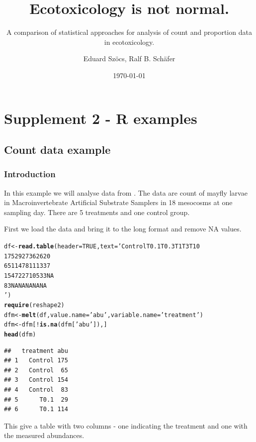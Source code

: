\documentclass{scrartcl}\usepackage[]{graphicx}\usepackage[]{color}
\title{Ecotoxicology is not normal.}
\subtitle{A comparison of statistical approaches for analysis of count and proportion data in ecotoxicology.}
\author{Eduard Szöcs, Ralf B. Schäfer}
\date{\today}
\makeatletter
\newcommand{\hlnum}[1]{\textcolor[rgb]{0.686,0.059,0.569}{#1}}%
\newcommand{\hlstr}[1]{\textcolor[rgb]{0.192,0.494,0.8}{#1}}%
\newcommand{\hlopt}[1]{\textcolor[rgb]{0,0,0}{#1}}%
\newcommand{\hlstd}[1]{\textcolor[rgb]{0.345,0.345,0.345}{#1}}%
\newcommand{\hlkwb}[1]{\textcolor[rgb]{0.69,0.353,0.396}{#1}}%
\newcommand{\hlkwc}[1]{\textcolor[rgb]{0.333,0.667,0.333}{#1}}%
\newcommand{\hlkwd}[1]{\textcolor[rgb]{0.737,0.353,0.396}{\textbf{#1}}}%
\newenvironment{kframe}{%
 \def\at@end@of@kframe{}%
 \ifinner\ifhmode%
  \def\at@end@of@kframe{\end{minipage}}%
  \begin{minipage}{\columnwidth}%
 \fi\fi%
 \def\FrameCommand##1{\hskip\@totalleftmargin \hskip-\fboxsep
 \colorbox{shadecolor}{##1}\hskip-\fboxsep
     \hskip-\linewidth \hskip-\@totalleftmargin \hskip\columnwidth}%
 \MakeFramed {\advance\hsize-\width
   \@totalleftmargin\z@ \linewidth\hsize
   \@setminipage}}%
 {\par\unskip\endMakeFramed%
 \at@end@of@kframe}
\newenvironment{knitrout}{}{} %
\makeatother
\begin{document}
\maketitle

\setcounter{section}{1}
\section{Supplement 2 - R examples}
\subsection{Count data example}
\subsubsection{Introduction}
In this example we will analyse data from \citep{brock_minimum_2015}.
The data are count of mayfly larvae in Macroinvertebrate Artificial Substrate Samplers in 18 mesocosms at one sampling day.
There are 5 treatments and one control group.

First we load the data and bring it to the long format and remove NA values.
\begin{knitrout}
\color{fgcolor}\begin{kframe}
\begin{alltt}
\hlstd{df} \hlkwb{<-} \hlkwd{read.table}\hlstd{(}\hlkwc{header} \hlstd{=} \hlnum{TRUE}\hlstd{,} \hlkwc{text} \hlstd{=} \hlstr{'Control  T0.1 T0.3  T1  T3  T10
175 29  27  36  26  20
65  114 78  11  13  37
154 72  27  105 33  NA
83  NA  NA  NA  NA  NA
'}\hlstd{)}
\hlkwd{require}\hlstd{(reshape2)}
\hlstd{dfm} \hlkwb{<-} \hlkwd{melt}\hlstd{(df,} \hlkwc{value.name} \hlstd{=} \hlstr{'abu'}\hlstd{,} \hlkwc{variable.name} \hlstd{=} \hlstr{'treatment'}\hlstd{)}
\hlstd{dfm} \hlkwb{<-} \hlstd{dfm[}\hlopt{!}\hlkwd{is.na}\hlstd{(dfm[}\hlstr{'abu'}\hlstd{]), ]}
\hlkwd{head}\hlstd{(dfm)}
\end{alltt}
\begin{verbatim}
##   treatment abu
## 1   Control 175
## 2   Control  65
## 3   Control 154
## 4   Control  83
## 5      T0.1  29
## 6      T0.1 114
\end{verbatim}
\end{kframe}
\end{knitrout}
This give a table with two columns - one indicating the treatment and one with the measured abundances.
\end{document}
